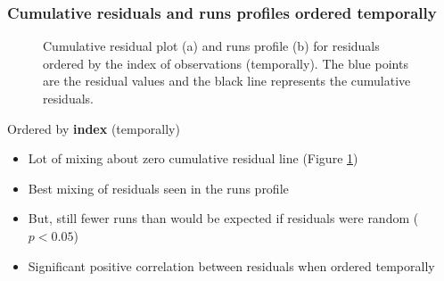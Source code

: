 \begin{frame}[fragile]
\frametitle{Cumulative residuals and runs profiles ordered temporally}  
\begin{figure}[h!]
  \centering
  \caption{Cumulative residual plot (a) and runs profile (b) for residuals ordered by the index of observations (temporally).  The blue points are the residual values and the black line represents the cumulative residuals.}
  \label{fig:nsgeeruns3}
\end{figure}
\end{frame}


\begin{frame}[fragile]
Ordered by \textbf{index} (temporally)
\begin{itemize}
\item Lot of mixing about zero cumulative residual line (Figure \ref{fig:nsgeeruns3})
\item Best mixing of residuals seen in the runs profile 
\item But, still fewer runs than would be expected if residuals were random ($p<0.05$)
\item Significant positive correlation between residuals when ordered temporally
\end{itemize}
\end{frame}

